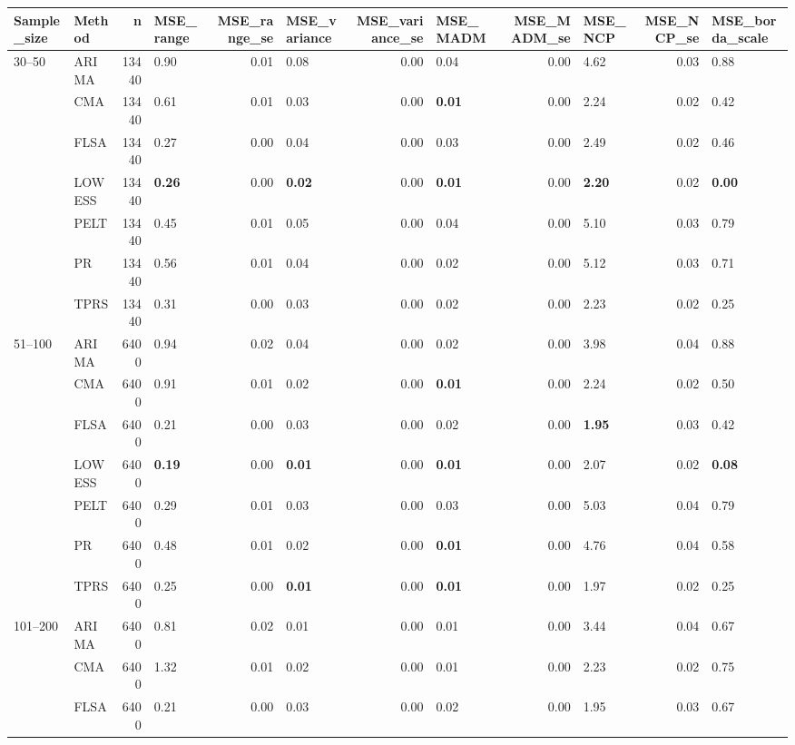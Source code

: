 \begin{table}[ht]
\centering
\begin{tabular}{llrlrlrlrlrl}
  \toprule
Sample_size & Method & n & MSE_range & MSE_range_se & MSE_variance & MSE_variance_se & MSE_MADM & MSE_MADM_se & MSE_NCP & MSE_NCP_se & MSE_borda_scale \\ 
  \midrule
30–50 & ARIMA & 13440 & 0.90 & 0.01 & 0.08 & 0.00 & 0.04 & 0.00 & 4.62 & 0.03 & 0.88 \\ 
   & CMA & 13440 & 0.61 & 0.01 & 0.03 & 0.00 & \textbf{0.01} & 0.00 & 2.24 & 0.02 & 0.42 \\ 
   & FLSA & 13440 & 0.27 & 0.00 & 0.04 & 0.00 & 0.03 & 0.00 & 2.49 & 0.02 & 0.46 \\ 
   & LOWESS & 13440 & \textbf{0.26} & 0.00 & \textbf{0.02} & 0.00 & \textbf{0.01} & 0.00 & \textbf{2.20} & 0.02 & \textbf{0.00} \\ 
   & PELT & 13440 & 0.45 & 0.01 & 0.05 & 0.00 & 0.04 & 0.00 & 5.10 & 0.03 & 0.79 \\ 
   & PR & 13440 & 0.56 & 0.01 & 0.04 & 0.00 & 0.02 & 0.00 & 5.12 & 0.03 & 0.71 \\ 
   & TPRS & 13440 & 0.31 & 0.00 & 0.03 & 0.00 & 0.02 & 0.00 & 2.23 & 0.02 & 0.25 \\ 
  51–100 & ARIMA & 6400 & 0.94 & 0.02 & 0.04 & 0.00 & 0.02 & 0.00 & 3.98 & 0.04 & 0.88 \\ 
   & CMA & 6400 & 0.91 & 0.01 & 0.02 & 0.00 & \textbf{0.01} & 0.00 & 2.24 & 0.02 & 0.50 \\ 
   & FLSA & 6400 & 0.21 & 0.00 & 0.03 & 0.00 & 0.02 & 0.00 & \textbf{1.95} & 0.03 & 0.42 \\ 
   & LOWESS & 6400 & \textbf{0.19} & 0.00 & \textbf{0.01} & 0.00 & \textbf{0.01} & 0.00 & 2.07 & 0.02 & \textbf{0.08} \\ 
   & PELT & 6400 & 0.29 & 0.01 & 0.03 & 0.00 & 0.03 & 0.00 & 5.03 & 0.04 & 0.79 \\ 
   & PR & 6400 & 0.48 & 0.01 & 0.02 & 0.00 & \textbf{0.01} & 0.00 & 4.76 & 0.04 & 0.58 \\ 
   & TPRS & 6400 & 0.25 & 0.00 & \textbf{0.01} & 0.00 & \textbf{0.01} & 0.00 & 1.97 & 0.02 & 0.25 \\ 
  101–200 & ARIMA & 6400 & 0.81 & 0.02 & 0.01 & 0.00 & 0.01 & 0.00 & 3.44 & 0.04 & 0.67 \\ 
   & CMA & 6400 & 1.32 & 0.01 & 0.02 & 0.00 & 0.01 & 0.00 & 2.23 & 0.02 & 0.75 \\ 
   & FLSA & 6400 & 0.21 & 0.00 & 0.03 & 0.00 & 0.02 & 0.00 & 1.95 & 0.03 & 0.67 \\ 

\end{tabular}
\end{table}
